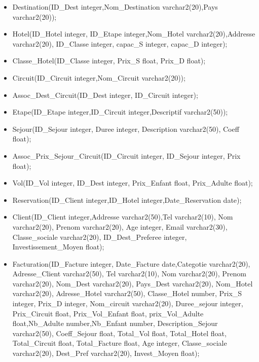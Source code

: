 \begin{itemize}
\item Destination(ID\_Dest integer,Nom\_Destination varchar2(20),Pays varchar2(20));\\
\item Hotel(ID\_Hotel integer, ID\_Etape integer,Nom\_Hotel varchar2(20),Addresse varchar2(20), ID\_Classe integer, capac\_S integer, capac\_D integer);\\
\item Classe\_Hotel(ID\_Classe integer, Prix\_S float, Prix\_D float);\\
\item Circuit(ID\_Circuit integer,Nom\_Circuit varchar2(20));\\
\item Assoc\_Dest\_Circuit(ID\_Dest integer, ID\_Circuit integer);\\
\item Etape(ID\_Etape integer,ID\_Circuit integer,Descriptif varchar2(50));\\
\item Sejour(ID\_Sejour integer, Duree integer, Description varchar2(50), Coeff float);\\
\item Assoc\_Prix\_Sejour\_Circuit(ID\_Circuit integer, ID\_Sejour integer, Prix float);\\
\item Vol(ID\_Vol integer, ID\_Dest integer, Prix\_Enfant float, Prix\_Adulte float);\\
\item Reservation(ID\_Client integer,ID\_Hotel integer,Date\_Reservation date);\\ 
\item Client(ID\_Client integer,Addresse varchar2(50),Tel varchar2(10), Nom varchar2(20), Prenom varchar2(20), Age integer, Email varchar2(30), Classe\_sociale varchar2(20), ID\_Dest\_Preferee integer, Investissement\_Moyen float);\\

\item Facturation(ID\_Facture integer, Date\_Facture date,Categotie varchar2(20), Adresse\_Client varchar2(50), Tel varchar2(10), Nom varchar2(20), Prenom varchar2(20), Nom\_Dest varchar2(20), Pays\_Dest varchar2(20), Nom\_Hotel varchar2(20), Adresse\_Hotel varchar2(50), Classe\_Hotel number, Prix\_S integer, Prix\_D integer, Nom\_circuit varchar2(20), Duree\_sejour integer, Prix\_Circuit float, Prix\_Vol\_Enfant float, prix\_Vol\_Adulte float,Nb\_Adulte number,Nb\_Enfant number, Description\_Sejour varchar2(50), Coeff\_Sejour float, Total\_Vol float, Total\_Hotel float,  Total\_Circuit float, Total\_Facture float, Age integer, Classe\_sociale varchar2(20), Dest\_Pref varchar2(20), Invest\_Moyen float);\\
\end{itemize}
\newpage


